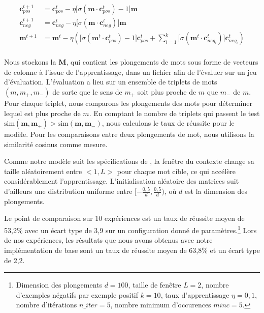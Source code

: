 \documentclass[12pt]{article}
\begin{document}
\begin{equation}\label{eq:update}
\begin{split}
    \mathbf{c}_{pos}^{t+1} & = \mathbf{c}_{pos}^t - \eta \lbrack \sigma(\mathbf{m} \cdot \mathbf{c}_{pos}^t) - 1 \rbrack \mathbf{m} \\
    \mathbf{c}_{neg}^{t+1} & = \mathbf{c}_{neg}^t - \eta \lbrack \sigma(\mathbf{m} \cdot \mathbf{c}_{neg}^t)\rbrack \mathbf{m} \\
    \mathbf{m}^{t+1} & = \mathbf{m}^t - \eta (\lbrack \sigma(\mathbf{m}^t \cdot \mathbf{c}_{pos}^t) - 1\rbrack \mathbf{c}_{pos}^t + \sum_{i=1}^k \lbrack \sigma(\mathbf{m}^t \cdot \mathbf{c}_{neg_i}^t) \rbrack \mathbf{c}_{neg_i}^t) \\
\end{split}
\end{equation}

Nous stockons la $\mathbf{M}$, qui contient les plongements de mots sous forme de vecteurs de colonne à l'issue de l'apprentissage, dans un fichier afin de l'évaluer sur un jeu d'évaluation. L'évaluation a lieu sur un ensemble de triplets de mots $(m, m_+, m_-)$ de sorte que le sens de $m_+$ soit plus proche de $m$ que $m_-$ de $m$. Pour chaque triplet, nous comparons les plongements des mots pour déterminer lequel est plus proche de $m$. En comptant le nombre de triplets qui passent le test $ \text{sim}(\mathbf{m}, \mathbf{m}_+) > \text{sim}(\mathbf{m}, \mathbf{m}_-)$, nous calculons le taux de réussite pour le modèle. Pour les comparaisons entre deux plongements de mot, nous utilisons la similarité cosinus comme mesure. 

Comme notre modèle suit les spécifications de \cite{DBLP:journals/corr/abs-1301-3781}, la fenêtre du contexte change sa taille aléatoirement entre $<1, L>$ pour chaque mot cible, ce qui accélère considérablement l'apprentissage. L'initialisation aléatoire des matrices suit d'ailleurs une distribution uniforme entre $[-\frac{0{,}5}{d}, \frac{0{,}5}{d})$, où $d$ est la dimension des plongements.

Le point de comparaison sur 10 expériences est un taux de réussite moyen de 53{,}2\% avec un écart type de 3{,}9 sur un configuration donné de paramètres.\footnote{Dimension des plongements $d=100$, taille de fenêtre $L=2$, nombre d'exemples négatifs par exemple positif $k=10$, taux d'apprentissage $\eta=0{,}1$, nombre d'itérations $n\_ iter=5$, nombre minimum d'occurences $minc=5$.} Lors de nos expériences, les résultats que nous avons obtenus avec notre implémentation de base sont un taux de réussite moyen de 63{,}8\% et un écart type de 2{,}2.
\end{document}
